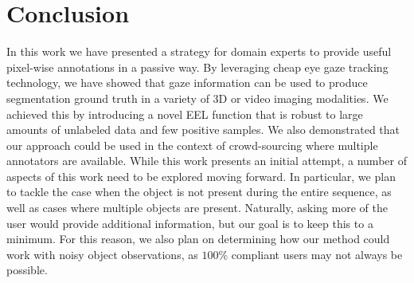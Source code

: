 \section{Conclusion}
In this work we have presented a strategy for domain experts to provide useful pixel-wise
annotations in a passive way. By leveraging cheap eye gaze tracking technology, we have showed
that gaze information can be used to produce segmentation ground truth in a variety of 3D
or video imaging modalities. We achieved this by introducing a novel EEL function that is
robust to large amounts of unlabeled data and few positive samples. We also demonstrated
that our approach could be used in the context of crowd-sourcing where multiple annotators
are available.
While this work presents an initial attempt, a number of aspects of this work need to
be explored moving forward. In particular, we plan to tackle the case when the object is not
present during the entire sequence, as well as cases where multiple objects are present. Naturally,
asking more of the user would provide additional information, but our goal is to keep this to a
minimum. For this reason, we also plan on determining how our method could work with noisy
object observations, as $100\%$ compliant users may not always be possible.

